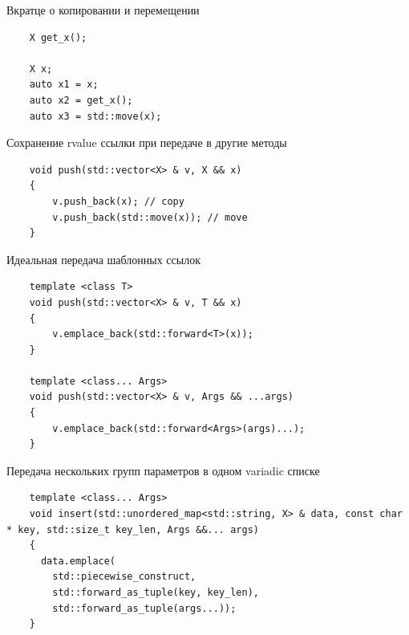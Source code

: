 \documentclass[unknownkeysallowed,xcolor=table]{beamer}
\begin{document}
\begin{frame}[fragile]{Вкратце о копировании и перемещении}
  \begin{lstlisting}
    X get_x();

    X x;
    auto x1 = x;
    auto x2 = get_x();
    auto x3 = std::move(x);
  \end{lstlisting}
\end{frame}

\begin{frame}[fragile]{Сохранение rvalue ссылки при передаче в другие методы}
  \begin{lstlisting}
    void push(std::vector<X> & v, X && x)
    {
        v.push_back(x); // copy
        v.push_back(std::move(x)); // move
    }
  \end{lstlisting}
\end{frame}

\begin{frame}[fragile]{Идеальная передача шаблонных ссылок}
  \begin{lstlisting}
    template <class T>
    void push(std::vector<X> & v, T && x)
    {
        v.emplace_back(std::forward<T>(x));
    }

    template <class... Args>
    void push(std::vector<X> & v, Args && ...args)
    {
        v.emplace_back(std::forward<Args>(args)...);
    }
  \end{lstlisting}
\end{frame}

\begin{frame}[fragile]{Передача нескольких групп параметров в одном variadic списке}
  \begin{lstlisting}
    template <class... Args>
    void insert(std::unordered_map<std::string, X> & data, const char * key, std::size_t key_len, Args &&... args)
    {
      data.emplace(
        std::piecewise_construct,
        std::forward_as_tuple(key, key_len),
        std::forward_as_tuple(args...));
    }
  \end{lstlisting}
\end{frame}
\end{document}
